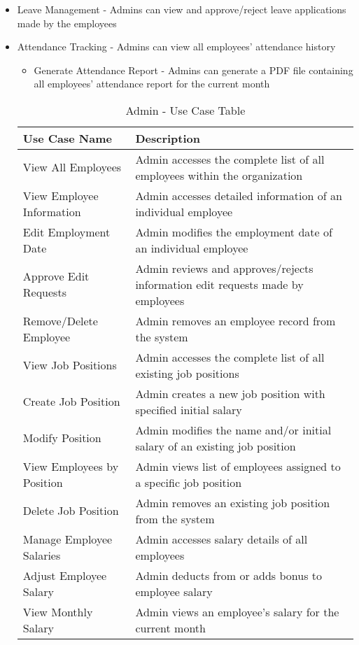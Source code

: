 \documentclass[journal]{./IEEE/IEEEtran}
\begin{document}
\begin{itemize}
\begin{itemize}
    \end{itemize}
    \item Leave Management - Admins can view and approve/reject leave applications made by the employees
    \item Attendance Tracking - Admins can view all employees' attendance history
    \begin{itemize}
        \item Generate Attendance Report - Admins can generate a PDF file containing all employees' attendance report for the current month
    \end{itemize}
\begin{table}[H]
\centering
\caption{Admin - Use Case Table}
\label{tab:admin-usecase}
\begin{tabular}{|p{}|p{}|}
\hline
\textbf{Use Case Name} & \textbf{Description} \\
\hline
View All Employees & Admin accesses the complete list of all employees within the organization \\
\hline
View Employee Information & Admin accesses detailed information of an individual employee \\
\hline
Edit Employment Date & Admin modifies the employment date of an individual employee \\
\hline
Approve Edit Requests & Admin reviews and approves/rejects information edit requests made by employees \\
\hline
Remove/Delete Employee & Admin removes an employee record from the system \\
\hline
View Job Positions & Admin accesses the complete list of all existing job positions \\
\hline
Create Job Position & Admin creates a new job position with specified initial salary \\
\hline
Modify Position & Admin modifies the name and/or initial salary of an existing job position \\
\hline
View Employees by Position & Admin views list of employees assigned to a specific job position \\
\hline
Delete Job Position & Admin removes an existing job position from the system \\
\hline
Manage Employee Salaries & Admin accesses salary details of all employees \\
\hline
Adjust Employee Salary & Admin deducts from or adds bonus to employee salary \\
\hline
View Monthly Salary & Admin views an employee's salary for the current month \\

\end{tabular}
\end{table}
\end{itemize}
\end{document}
